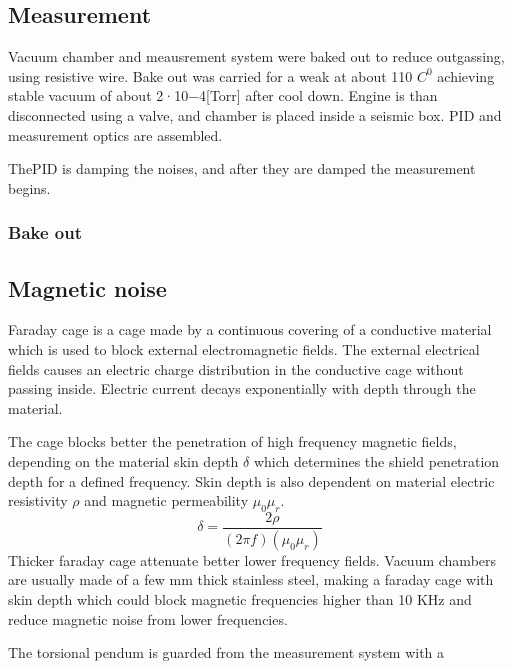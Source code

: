\documentclass[\main/master.tex]{subfiles}
\begin{document}
\subsection{Measurement}
Vacuum chamber and meausrement system were baked out to reduce outgassing, using resistive wire. Bake out was carried for a weak at about 110 $C^0$ achieving stable vacuum of about 2·10−4[Torr] after cool down. Engine is than disconnected using a valve, and chamber is placed inside a seismic box.
PID and measurement optics are assembled.

\par\noindent
ThePID is damping the noises, and after they are damped the measurement begins.








\subsubsection{Bake out}










\subsection{Magnetic noise}

Faraday cage is a cage made by a continuous covering of a conductive material which is used to block external electromagnetic fields. The external electrical fields causes an electric charge distribution in the conductive cage without passing inside. Electric current decays exponentially with depth through the material.

\par\noindent
The cage blocks better the penetration of high frequency magnetic fields, depending on the material skin depth $\delta$ which determines the shield penetration depth for a defined frequency. Skin depth is also dependent on material electric resistivity $\rho$ and magnetic permeability $\mu_0\mu_r$. 
\begin{equation}
\delta = \frac{2\rho}{(2\pi f)(\mu_0\mu_r)}     \label{eqn:mean-free-pass}
\end{equation}
Thicker faraday cage attenuate better lower frequency fields. Vacuum chambers are usually made of a few mm thick stainless steel, making a faraday cage with skin depth which could block magnetic frequencies higher than 10 KHz and reduce magnetic noise from lower frequencies.
\par\noindent
The torsional pendum is guarded from the measurement system with a 
\end{document}
